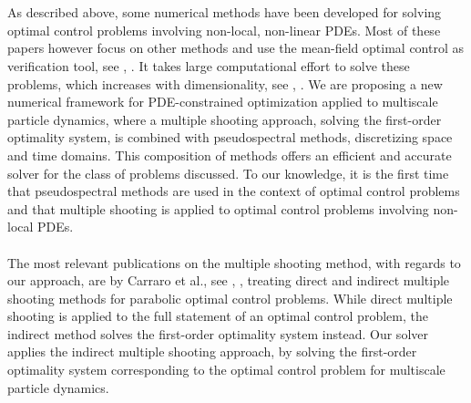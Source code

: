 \documentclass[11pt, a4paper]{article}
\theoremstyle{definition}
\begin{document}
\\
\\
As described above, some numerical methods have been developed for solving optimal control problems involving non-local, non-linear PDEs. Most of these papers however focus on other methods and use the mean-field optimal control as verification tool, see \cite{Pinnau_2017}, \cite{albi2016mean}. It takes large computational effort to solve these problems, which increases with dimensionality, see \cite{burger2019instantaneous}, \cite{burger2016controlling}. 
We are proposing a new numerical framework for PDE-constrained optimization applied to multiscale particle dynamics, where a multiple shooting approach, solving the first-order optimality system, is combined with pseudospectral methods, discretizing space and time domains. This composition of methods offers an efficient and accurate solver for the class of problems discussed. To our knowledge, it is the first time that pseudospectral methods are used in the context of optimal control problems and that multiple shooting is applied to optimal control problems involving non-local PDEs.
\\
\\
The most relevant publications on the multiple shooting method, with regards to our approach, are by Carraro et al., see \cite{CarraroDirectIndirectMultipleShooting}, \cite{CarraroIndMultipleShooting}, treating direct and indirect multiple shooting methods for parabolic optimal control problems. While direct multiple shooting is applied to the full statement of an optimal control problem, the indirect method solves the first-order optimality system instead. Our solver applies the indirect multiple shooting approach, by solving the first-order optimality system corresponding to the optimal control problem for multiscale particle dynamics.





\pagebreak	


\end{document}
